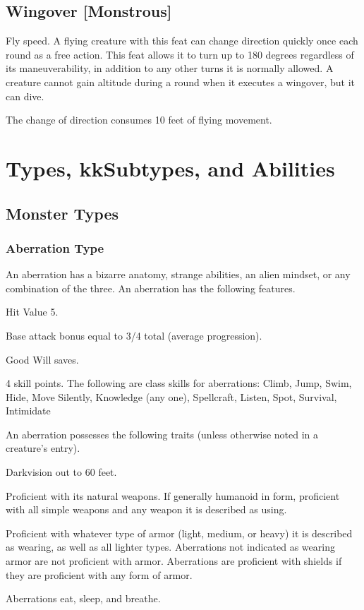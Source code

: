 \subsection{Wingover [Monstrous]}
 Fly speed.
 A flying creature with this feat can change direction quickly once each round as a free action. This feat allows it to turn up to 180 degrees regardless of its maneuverability, in addition to any other turns it is normally allowed. A creature cannot gain altitude during a round when it executes a wingover, but it can dive.

The change of direction consumes 10 feet of flying movement.

\section{Types, kkSubtypes, and Abilities}


\subsection{Monster Types}
\subsubsection{Aberration Type} An aberration has a bizarre anatomy, strange abilities, an alien mindset, or any combination of the three.
 An aberration has the following features.
\begin{itemize*}
\item Hit Value 5.
\item Base attack bonus equal to 3/4 total  (average progression).
\item Good Will saves.
\item 4 skill points. The following are class skills for aberrations: Climb, Jump, Swim, Hide, Move Silently, Knowledge (any one), Spellcraft, Listen, Spot, Survival, Intimidate 
\end{itemize*}
 An aberration possesses the following traits (unless otherwise noted in a creature's entry).
\begin{itemize*}
\item Darkvision out to 60 feet.
\item Proficient with its natural weapons. If generally humanoid in form, proficient with all simple weapons and any weapon  it is described as using.
\item Proficient with whatever type of armor (light, medium, or heavy) it is described as wearing, as well as all lighter types. Aberrations not indicated as wearing armor are not proficient with armor. Aberrations are proficient with shields if they are proficient with any form of armor.
\item Aberrations eat, sleep, and breathe.
\end{itemize*}

